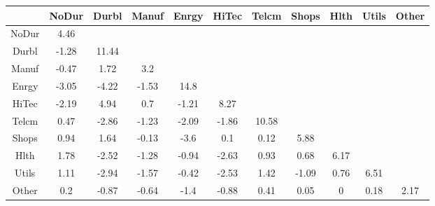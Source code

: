 \begin{tabular}{ccccccccccc}
  \hline
 & NoDur & Durbl & Manuf & Enrgy & HiTec & Telcm & Shops & Hlth & Utils & Other \\ 
  \hline
NoDur & 4.46 &  &  &  &  &  &  &  &  &  \\ 
  Durbl & -1.28 & 11.44 &  &  &  &  &  &  &  &  \\ 
  Manuf & -0.47 & 1.72 & 3.2 &  &  &  &  &  &  &  \\ 
  Enrgy & -3.05 & -4.22 & -1.53 & 14.8 &  &  &  &  &  &  \\ 
  HiTec & -2.19 & 4.94 & 0.7 & -1.21 & 8.27 &  &  &  &  &  \\ 
  Telcm & 0.47 & -2.86 & -1.23 & -2.09 & -1.86 & 10.58 &  &  &  &  \\ 
  Shops & 0.94 & 1.64 & -0.13 & -3.6 & 0.1 & 0.12 & 5.88 &  &  &  \\ 
  Hlth & 1.78 & -2.52 & -1.28 & -0.94 & -2.63 & 0.93 & 0.68 & 6.17 &  &  \\ 
  Utils & 1.11 & -2.94 & -1.57 & -0.42 & -2.53 & 1.42 & -1.09 & 0.76 & 6.51 &  \\ 
  Other & 0.2 & -0.87 & -0.64 & -1.4 & -0.88 & 0.41 & 0.05 & 0 & 0.18 & 2.17 \\ 
   \hline
\end{tabular}
